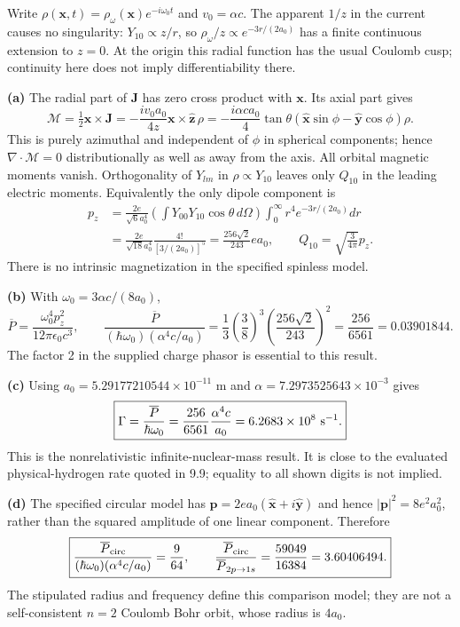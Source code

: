 Write $\rho(\mathbf x,t)=\rho_\omega(\mathbf x)e^{-i\omega_0t}$ and
$v_0=\alpha c$. The apparent $1/z$ in the current causes no singularity:
$Y_{10}\propto z/r$, so $\rho_\omega/z\propto e^{-3r/(2a_0)}$
has a finite continuous extension to $z=0$. At the origin this radial
function has the usual Coulomb cusp; continuity here does not imply
differentiability there.

\textbf{(a)} The radial part of $\mathbf J$ has zero cross product with
$\mathbf x$. Its axial part gives
\[
\mathcal M=\tfrac12\mathbf x\times\mathbf J
=-\frac{iv_0a_0}{4z}\mathbf x\times\hat{\mathbf z}\,\rho
=-\frac{i\alpha ca_0}{4}\tan\theta
(\hat{\mathbf x}\sin\phi-\hat{\mathbf y}\cos\phi)\rho.
\]
This is purely azimuthal and independent of $\phi$ in spherical components;
hence $\nabla\cdot\mathcal M=0$ distributionally as well as away from the
axis. All orbital magnetic moments vanish. Orthogonality of $Y_{lm}$ in
$\rho\propto Y_{10}$ leaves only $Q_{10}$ in the leading electric moments.
Equivalently the only dipole component is
\begin{align*}
p_z&=\frac{2e}{\sqrt6a_0^4}
\left(\int Y_{00}Y_{10}\cos\theta\,d\Omega\right)
\int_0^\infty r^4e^{-3r/(2a_0)}dr\\
&=\frac{2e}{\sqrt{18}a_0^4}
\frac{4!}{[3/(2a_0)]^5}
=\boxed{\frac{256\sqrt2}{243}ea_0},\qquad
Q_{10}=\sqrt{\frac3{4\pi}}p_z.
\end{align*}
There is no intrinsic magnetization in the specified spinless model.

\textbf{(b)} With $\omega_0=3\alpha c/(8a_0)$,
\[
\overline P=\frac{\omega_0^4p_z^2}{12\pi\epsilon_0c^3},\qquad
\frac{\overline P}{(\hbar\omega_0)(\alpha^4c/a_0)}
=\frac13\left(\frac38\right)^3
\left(\frac{256\sqrt2}{243}\right)^2
=\boxed{\frac{256}{6561}=0.03901844.}
\]
The factor 2 in the supplied charge phasor is essential to this result.

\textbf{(c)} Using $a_0=5.29177210544\times10^{-11}$ m and
$\alpha=7.2973525643\times10^{-3}$ gives
\[
\boxed{\Gamma=\frac{\overline P}{\hbar\omega_0}
=\frac{256}{6561}\frac{\alpha^4c}{a_0}
=6.2683\times10^8\ {\rm s}^{-1}.}
\]
This is the nonrelativistic infinite-nuclear-mass result. It is close to
the evaluated physical-hydrogen rate quoted in 9.9; equality to all shown
digits is not implied.

\textbf{(d)} The specified circular model has
$\mathbf p=2ea_0(\hat{\mathbf x}+i\hat{\mathbf y})$ and hence
$|\mathbf p|^2=8e^2a_0^2$, rather than the squared amplitude of one
linear component. Therefore
\[
\boxed{\frac{\overline P_{\rm circ}}
{(\hbar\omega_0)(\alpha^4c/a_0)}=\frac9{64},\qquad
\frac{\overline P_{\rm circ}}{\overline P_{2p\to1s}}
=\frac{59049}{16384}=3.60406494.}
\]
The stipulated radius and frequency define this comparison model; they
are not a self-consistent $n=2$ Coulomb Bohr orbit, whose radius is $4a_0$.

